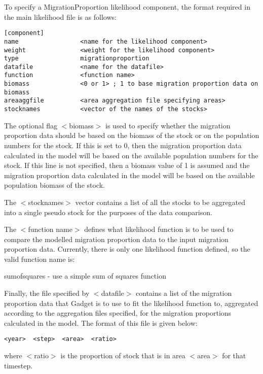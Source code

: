 \documentclass[10pt,twoside]{book}
\begin{document}
\bigskip
To specify a MigrationProportion likelihood component, the format required in the main likelihood file is as follows:

{\small\begin{verbatim}
[component]
name                 <name for the likelihood component>
weight               <weight for the likelihood component>
type                 migrationproportion
datafile             <name for the datafile>
function             <function name>
biomass              <0 or 1> ; 1 to base migration proportion data on biomass
areaaggfile          <area aggregation file specifying areas>
stocknames           <vector of the names of the stocks>
\end{verbatim}}

The optional flag $<$biomass$>$ is used to specify whether the migration proportion data should be based on the biomass of the stock or on the population numbers for the stock.  If this is set to 0, then the migration proportion data calculated in the model will be based on the available population numbers for the stock.  If this line is not specified, then a biomass value of 1 is assumed and the migration proportion data calculated in the model will be based on the available population biomass of the stock.

\bigskip
The $<$stocknames$>$ vector contains a list of all the stocks to be aggregated into a single pseudo stock for the purposes of the data comparison.

\bigskip
The $<$function name$>$ defines what likelihood function is to be used to compare the modelled migration proportion data to the input migration proportion data.  Currently, there is only one likelihood function defined, so the valid function name is:

\bigskip
sumofsquares - use a simple sum of squares function

\bigskip
Finally, the file specified by $<$datafile$>$ contains a list of the migration proportion data that Gadget is to use to fit the likelihood function to, aggregated according to the aggregation files specified, for the migration proportions calculated in the model.  The format of this file is given below:

{\small\begin{verbatim}
<year>  <step>  <area>  <ratio>
\end{verbatim}}

where $<$ratio$>$ is the proportion of stock that is in area $<$area$>$ for that timestep.
\end{document}
